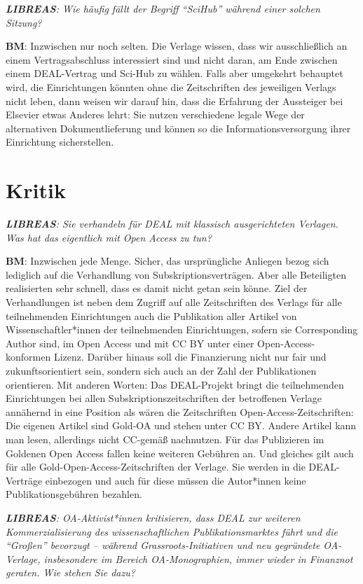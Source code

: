 \documentclass[a4paper,
fontsize=11pt,
oneside,
numbers=noperiodatend,
parskip=half-,
bibliography=totoc,
final
]{scrartcl}
\begin{document}
\emph{\textbf{LIBREAS}: Wie häufig fällt der Begriff \enquote{SciHub}
während einer solchen Sitzung?}

\textbf{BM}: Inzwischen nur noch selten. Die Verlage wissen, dass wir
ausschließlich an einem Vertragsabschluss interessiert sind und nicht
daran, am Ende zwischen einem DEAL-Vertrag und Sci-Hub zu wählen. Falls
aber umgekehrt behauptet wird, die Einrichtungen könnten ohne die
Zeitschriften des jeweiligen Verlags nicht leben, dann weisen wir darauf
hin, dass die Erfahrung der Aussteiger bei Elsevier etwas Anderes lehrt:
Sie nutzen verschiedene legale Wege der alternativen Dokumentlieferung
und können so die Informationsversorgung ihrer Einrichtung
sicherstellen.

\hypertarget{kritik}{%
\section*{Kritik}\label{kritik}}

\emph{\textbf{LIBREAS}: Sie verhandeln für DEAL mit klassisch
ausgerichteten Verlagen. Was hat das eigentlich mit Open Access zu tun?
}

\textbf{BM}: Inzwischen jede Menge. Sicher, das ursprüngliche Anliegen
bezog sich lediglich auf die Verhandlung von Subskriptionsverträgen.
Aber alle Beteiligten realisierten sehr schnell, dass es damit nicht
getan sein könne. Ziel der Verhandlungen ist neben dem Zugriff auf alle
Zeitschriften des Verlags für alle teilnehmenden Einrichtungen auch die
Publikation aller Artikel von Wissenschaftler*innen der teilnehmenden
Einrichtungen, sofern sie Corresponding Author sind, im Open Access und
mit CC BY unter einer Open-Access-konformen Lizenz. Darüber hinaus soll
die Finanzierung nicht nur fair und zukunftsorientiert sein, sondern
sich auch an der Zahl der Publikationen orientieren. Mit anderen Worten:
Das DEAL-Projekt bringt die teilnehmenden Einrichtungen bei allen
Subskriptionszeitschriften der betroffenen Verlage annähernd in eine
Position als wären die Zeitschriften Open-Access-Zeitschriften: Die
eigenen Artikel sind Gold-OA und stehen unter CC BY. Andere Artikel kann
man lesen, allerdings nicht CC-gemäß nachnutzen. Für das Publizieren im
Goldenen Open Access fallen keine weiteren Gebühren an. Und gleiches
gilt auch für alle Gold-Open-Access-Zeitschriften der Verlage. Sie
werden in die DEAL-Verträge einbezogen und auch für diese müssen die
Autor*innen keine Publikationsgebühren bezahlen.

\emph{\textbf{LIBREAS}: OA-Aktivist*innen kritisieren, dass DEAL zur
weiteren Kommerzialisierung des wissenschaftlichen Publikationsmarktes
führt und die \enquote{Großen} bevorzugt -- während
Grassroots-Initiativen und neu gegründete OA-Verlage, insbesondere im
Bereich OA-Monographien, immer wieder in Finanznot geraten. Wie stehen
Sie dazu?}
\end{document}
